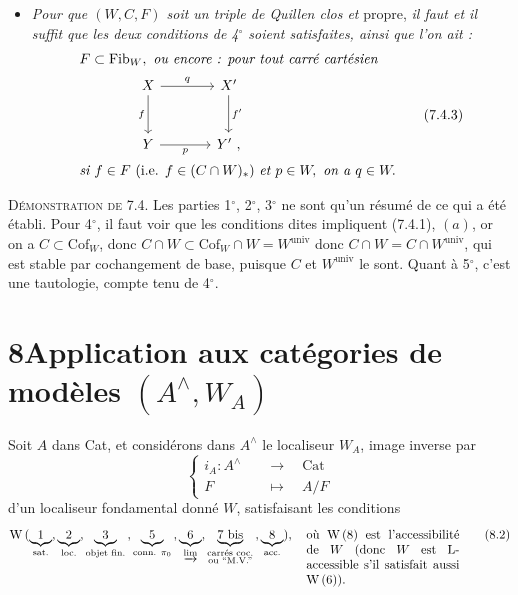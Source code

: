 \documentclass[11pt]{article}
\newcommand{\printedpage}[1]{\marginpar{\raggedright\footnotesize p.~#1}}
\newcommand{\msp}[1]{\marginpar{\raggedright\footnotesize [#1]}}
\newcommand{\Cof}{\mathrm{Cof}}
\newcommand{\Fib}{\mathrm{Fib}}
\newcommand{\Cat}{\mathrm{Cat}}
\newcommand{\univ}{\mathrm{univ}}
\newcommand{\chap}{^{\wedge}}
\begin{document}
\begin{itemize}[leftmargin=*]
\item[5$^\circ$)] \printedpage{55}
\textit{Pour que $(W,C,F)$ soit un triple de Quillen clos et} propre, \textit{il faut et il suffit que les deux conditions de 4$^\circ$ soient satisfaites, ainsi que l'on ait :}
\[
\begin{aligned}
&F\subset \Fib_W,\ \textit{ou encore : pour tout carré cartésien}\\
&\qquad\qquad\begin{tikzcd}[ampersand replacement=\&, row sep=large, column sep=large]
X \arrow[r, "q"] \arrow[d, "f"'] \& X' \arrow[d, "f'"] \\
Y \arrow[r, "p"'] \& Y'\ ,
\end{tikzcd}\\
&\textit{si } f\in F \ (\text{i.e. } f\in (C\cap W)_*)\ \textit{et } p\in W,\ \textit{on a } q\in W.
\end{aligned}
\tag*{(7.4.3)}
\]
\end{itemize}

\textsc{Démonstration de} 7.4. Les parties 1$^\circ$, 2$^\circ$, 3$^\circ$ ne sont qu'un résumé de ce qui a été établi. Pour 4$^\circ$, il faut voir que les conditions dites impliquent (7.4.1), $(a)$, or on a $C\subset \Cof_W$, donc $C\cap W\subset \Cof_W\cap W = W^{\univ}$
\msp{page 100}
donc $C\cap W = C\cap W^{\univ}$, qui est stable par cochangement de base, puisque $C$ et $W^{\univ}$ le sont. Quant à 5$^\circ$, c'est une tautologie, compte tenu de 4$^\circ$.

\section*{8\quad Application aux catégories de modèles $(A\chap,W_A)$}

Soit $A$ dans Cat, et considérons dans $A\chap$ le localiseur $W_A$, image inverse par
\[
\left\{
\begin{aligned}
i_A : A\chap \quad &\longrightarrow \quad \Cat\\
F \quad &\longmapsto \quad A/F
\end{aligned}
\right.
\tag*{(8.1)}
\]
d'un localiseur fondamental donné $W$, satisfaisant les conditions
\[
\mathrm{W}\,(\underbrace{1}_{\text{sat.}},\underbrace{2}_{\text{loc.}},\underbrace{3}_{\text{objet fin.}}\,,\underbrace{5}_{\text{conn. }\pi_0}\,,\underbrace{6}_{\varinjlim},\underbrace{7\text{ bis}}_{\substack{\text{carrés coc.}\\ \text{ou ``M.V.''}}}\,,\underbrace{8}_{\text{acc.}}),\quad
\text{\parbox[t]{4.3cm}{où W\,(8) est l'accessibilité de $W$ (donc $W$ est L-accessible s'il satisfait aussi W\,(6)).}}
\tag*{(8.2)}
\]
\end{document}
